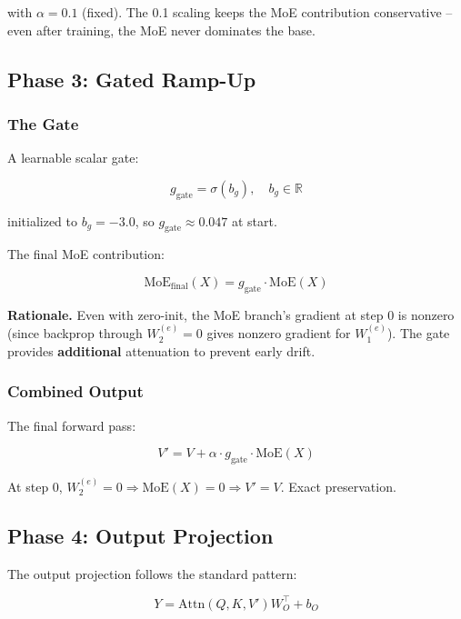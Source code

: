 with $\alpha = 0.1$ (fixed). The 0.1 scaling keeps the MoE contribution 
conservative -- even after training, the MoE never dominates the base.

\subsection{Phase 3: Gated Ramp-Up}

\subsubsection{The Gate}

A learnable scalar gate:

\begin{equation}
g_\text{gate} = \sigma(b_g), \quad b_g \in \mathbb{R}
\end{equation}

initialized to $b_g = -3.0$, so $g_\text{gate} \approx 0.047$ at start.

The final MoE contribution:

\begin{equation}
\text{MoE}_\text{final}(X) = g_\text{gate} \cdot \text{MoE}(X)
\end{equation}

\textbf{Rationale.} Even with zero-init, the MoE branch's gradient at step 0 is 
nonzero (since backprop through $W_2^{(e)} = 0$ gives nonzero gradient for 
$W_1^{(e)}$). The gate provides \textbf{additional} attenuation to prevent early 
drift.

\subsubsection{Combined Output}

The final forward pass:

\begin{equation}
V' = V + \alpha \cdot g_\text{gate} \cdot \text{MoE}(X)
\end{equation}

At step 0, $W_2^{(e)} = 0 \Rightarrow \text{MoE}(X) = 0 \Rightarrow V' = V$. 
Exact preservation.

\subsection{Phase 4: Output Projection}

The output projection follows the standard pattern:

\begin{equation}
Y = \text{Attn}(Q, K, V') W_O^\top + b_O
\end{equation}

